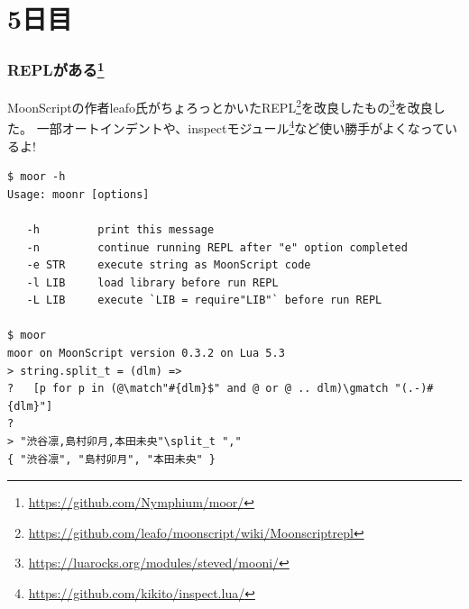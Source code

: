 \section{5日目}
\begin{frame}[fragile]
	\frametitle{REPLがある\footnote[frame]{\url{https://github.com/Nymphium/moor/}}}

	MoonScriptの作者leafo氏がちょろっとかいたREPL\footnote[frame]{\url{https://github.com/leafo/moonscript/wiki/Moonscriptrepl}}を改良したもの\footnote[frame]{\url{https://luarocks.org/modules/steved/mooni/}}を改良した。
	一部オートインデントや、inspectモジュール\footnote[frame]{\url{https://github.com/kikito/inspect.lua/}}など使い勝手がよくなっているよ!
	\tiny
	\begin{lstlisting}[numbers=none]
$ moor -h
Usage: moonr [options]

   -h         print this message
   -n         continue running REPL after "e" option completed
   -e STR     execute string as MoonScript code
   -l LIB     load library before run REPL
   -L LIB     execute `LIB = require"LIB"` before run REPL

$ moor
moor on MoonScript version 0.3.2 on Lua 5.3
> string.split_t = (dlm) =>
?   [p for p in (@\match"#{dlm}$" and @ or @ .. dlm)\gmatch "(.-)#{dlm}"]
?
> "渋谷凛,島村卯月,本田未央"\split_t ","
{ "渋谷凛", "島村卯月", "本田未央" }
	\end{lstlisting}
\end{frame}
